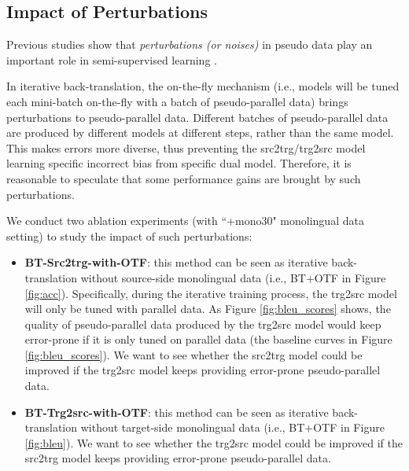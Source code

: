 \documentclass[letterpaper]{article} %
\begin{document}
\subsection{Impact of Perturbations}
\label{section:otf}


Previous studies show that \emph{perturbations (or noises)} in pseudo data play an important role in semi-supervised learning \cite{zhang2016exploiting,edunov2018understanding,he2019revisiting,xie2020self}.

In iterative back-translation, the on-the-fly mechanism (i.e., models will be tuned each mini-batch on-the-fly with a batch of pseudo-parallel data) brings perturbations to pseudo-parallel data.
Different batches of pseudo-parallel data are produced by different models at different steps, rather than the same model.
This makes errors more diverse, thus preventing the src2trg/trg2src model learning specific incorrect bias from specific dual model.
Therefore, it is reasonable to speculate that some performance gains are brought by such perturbations.

We conduct two ablation experiments (with ``+mono30" monolingual data setting) to study the impact of such perturbations:

\begin{itemize}
\item \textbf{BT-Src2trg-with-OTF}:
this method can be seen as iterative back-translation without source-side monolingual data (i.e., BT+OTF in Figure \ref{fig:acc}).
Specifically, during the iterative training process, the trg2src model will only be tuned with parallel data.
As Figure \ref{fig:bleu_scores} shows, the quality of pseudo-parallel data produced by the trg2src model would keep error-prone if it is only tuned on parallel data (the baseline curves in Figure \ref{fig:bleu_scores}).
We want to see whether the src2trg model could be improved if the trg2src model keeps providing error-prone pseudo-parallel data.
\item \textbf{BT-Trg2src-with-OTF}:
this method can be seen as iterative back-translation without target-side monolingual data (i.e., BT+OTF in Figure \ref{fig:bleu}).
We want to see whether the trg2src model could be improved if the src2trg model keeps providing error-prone pseudo-parallel data.
\end{itemize}
\end{document}
